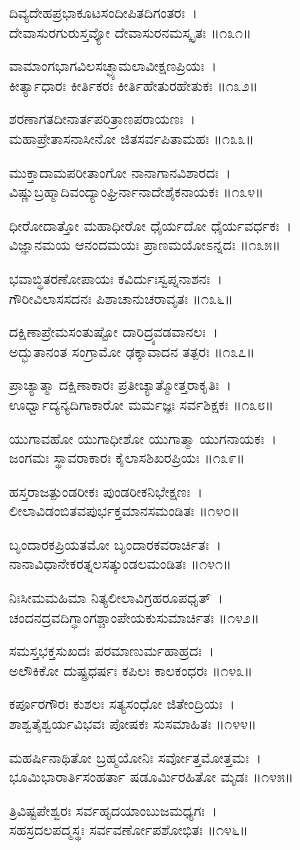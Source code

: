 ದಿವ್ಯದೇಹಪ್ರಭಾಕೂಟಸಂದೀಪಿತದಿಗಂತರಃ~।\\
ದೇವಾಸುರಗುರುಸ್ತವ್ಯೋ ದೇವಾಸುರನಮಸ್ಕೃತಃ ॥೧೩೧॥

	ವಾಮಾಂಗಭಾಗವಿಲಸಚ್ಛ್ಯಾಮಲಾವೀಕ್ಷಣಪ್ರಿಯಃ~।\\
	ಕೀರ್ತ್ಯಾಧಾರಃ ಕೀರ್ತಿಕರಃ ಕೀರ್ತಿಹೇತುರಹೇತುಕಃ ॥೧೩೨॥

ಶರಣಾಗತದೀನಾರ್ತಪರಿತ್ರಾಣಪರಾಯಣಃ~।\\
ಮಹಾಪ್ರೇತಾಸನಾಸೀನೋ ಜಿತಸರ್ವಪಿತಾಮಹಃ ॥೧೩೩॥

	ಮುಕ್ತಾದಾಮಪರೀತಾಂಗೋ ನಾನಾಗಾನವಿಶಾರದಃ~।\\
	ವಿಷ್ಣುಬ್ರಹ್ಮಾದಿವಂದ್ಯಾಂಘ್ರಿರ್ನಾನಾದೇಶೈಕನಾಯಕಃ ॥೧೩೪॥

ಧೀರೋದಾತ್ತೋ ಮಹಾಧೀರೋ ಧೈರ್ಯದೋ ಧೈರ್ಯವರ್ಧಕಃ~।\\
ವಿಜ್ಞಾನಮಯ ಆನಂದಮಯಃ ಪ್ರಾಣಮಯೋಽನ್ನದಃ ॥೧೩೫॥

	ಭವಾಬ್ಧಿತರಣೋಪಾಯಃ ಕವಿರ್ದುಃಸ್ವಪ್ನನಾಶನಃ~।\\
	ಗೌರೀವಿಲಾಸಸದನಃ ಪಿಶಾಚಾನುಚರಾವೃತಃ ॥೧೩೬॥

ದಕ್ಷಿಣಾಪ್ರೇಮಸಂತುಷ್ಟೋ ದಾರಿದ್ರ್ಯವಡವಾನಲಃ~।\\
ಅದ್ಭುತಾನಂತ ಸಂಗ್ರಾಮೋ ಢಕ್ಕಾವಾದನ ತತ್ಪರಃ ॥೧೩೭॥

	ಪ್ರಾಚ್ಯಾತ್ಮಾ ದಕ್ಷಿಣಾಕಾರಃ ಪ್ರತೀಚ್ಯಾತ್ಮೋತ್ತರಾಕೃತಿಃ~।\\
	ಊರ್ಧ್ವಾದ್ಯನ್ಯದಿಗಾಕಾರೋ ಮರ್ಮಜ್ಞಃ ಸರ್ವಶಿಕ್ಷಕಃ ॥೧೩೮॥

ಯುಗಾವಹೋ ಯುಗಾಧೀಶೋ ಯುಗಾತ್ಮಾ ಯುಗನಾಯಕಃ~।\\
ಜಂಗಮಃ ಸ್ಥಾವರಾಕಾರಃ ಕೈಲಾಸಶಿಖರಪ್ರಿಯಃ ॥೧೩೯॥

	ಹಸ್ತರಾಜತ್ಪುಂಡರೀಕಃ ಪುಂಡರೀಕನಿಭೇಕ್ಷಣಃ~।\\
	ಲೀಲಾವಿಡಂಬಿತವಪುರ್ಭಕ್ತಮಾನಸಮಂಡಿತಃ ॥೧೪೦॥

ಬೃಂದಾರಕಪ್ರಿಯತಮೋ ಬೃಂದಾರಕವರಾರ್ಚಿತಃ~।\\
ನಾನಾವಿಧಾನೇಕರತ್ನಲಸತ್ಕುಂಡಲಮಂಡಿತಃ ॥೧೪೧॥

	ನಿಃಸೀಮಮಹಿಮಾ ನಿತ್ಯಲೀಲಾವಿಗ್ರಹರೂಪಧೃತ್~।\\
	ಚಂದನದ್ರವದಿಗ್ಧಾಂಗಶ್ಚಾಂಪೇಯಕುಸುಮಾರ್ಚಿತಃ ॥೧೪೨॥

ಸಮಸ್ತಭಕ್ತಸುಖದಃ ಪರಮಾಣುರ್ಮಹಾಹ್ರದಃ~।\\
ಅಲೌಕಿಕೋ ದುಷ್ಪ್ರಧರ್ಷಃ ಕಪಿಲಃ ಕಾಲಕಂಧರಃ ॥೧೪೩॥

	ಕರ್ಪೂರಗೌರಃ ಕುಶಲಃ ಸತ್ಯಸಂಧೋ ಜಿತೇಂದ್ರಿಯಃ~।\\
	ಶಾಶ್ವತೈಶ್ವರ್ಯವಿಭವಃ ಪೋಷಕಃ ಸುಸಮಾಹಿತಃ ॥೧೪೪॥

ಮಹರ್ಷಿನಾಥಿತೋ ಬ್ರಹ್ಮಯೋನಿಃ ಸರ್ವೋತ್ತಮೋತ್ತಮಃ~।\\
ಭೂಮಿಭಾರಾರ್ತಿಸಂಹರ್ತಾ ಷಡೂರ್ಮಿರಹಿತೋ ಮೃಡಃ ॥೧೪೫॥

	ತ್ರಿವಿಷ್ಟಪೇಶ್ವರಃ ಸರ್ವಹೃದಯಾಂಬುಜಮಧ್ಯಗಃ~।\\
	ಸಹಸ್ರದಲಪದ್ಮಸ್ಥಃ ಸರ್ವವರ್ಣೋಪಶೋಭಿತಃ ॥೧೪೬॥

